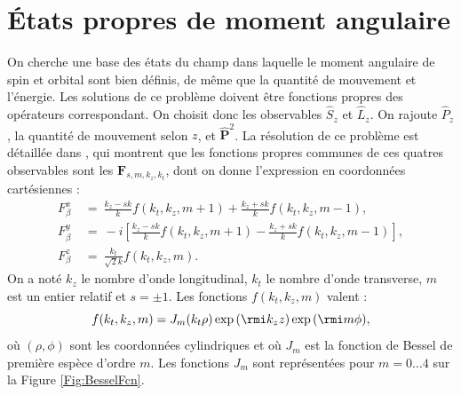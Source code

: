 \section{\'Etats propres de moment angulaire}
On cherche une base des états du champ dans laquelle le moment angulaire de spin et orbital sont bien définis, de même que la quantité de mouvement et l'énergie. Les solutions de ce problème doivent être fonctions propres des opérateurs correspondant. On choisit donc les observables $\hat{S}_z$ et $\hat{L}_z$. On rajoute $\hat{P}_z$, la quantité de mouvement selon $z$, et $\bm{\hat{P}}^2$. 
La résolution de ce problème est détaillée dans , qui montrent que les fonctions propres communes de ces quatres observables sont les $\bm{F}_{s,m,k_z,k_t}$, dont on donne l'expression en coordonnées cartésiennes :
\begin{equation}
\begin{aligned}
F_{\beta}^x ~&= ~\frac{k_z - sk}{k}f(k_t,k_z,m+1)+\frac{k_z + sk}{k}f(k_t,k_z,m-1),\\
F_{\beta}^y ~&= ~-i\left[\frac{k_z - sk}{k}f(k_t,k_z,m+1)-\frac{k_z + sk}{k}f(k_t,k_z,m-1)\right],\\
F_{\beta}^z ~&= ~\frac{k_t}{\sqrt{2}k}f(k_t,k_z,m).
\end{aligned}
\label{eqAMModes}
\end{equation}
On a noté $k_z$ le nombre d'onde longitudinal, $k_t$ le nombre d'onde transverse, $m$ est un entier relatif et $s=\pm1$. Les fonctions $f(k_t,k_z,m)$ valent :
\begin{equation}
f(k_t,k_z,m) = J_m(k_t\rho)\exp{(\rmi k_zz)}\exp{(\rmi m\phi)},
\label{eqModeFcn}
\end{equation}
où $(\rho,\phi)$ sont les coordonnées cylindriques et où $J_m$ est la fonction de Bessel de première espèce d'ordre $m$. Les fonctions $J_m$ sont représentées pour $m=0\ldots4$ sur la Figure \ref{Fig:BesselFcn}. 

